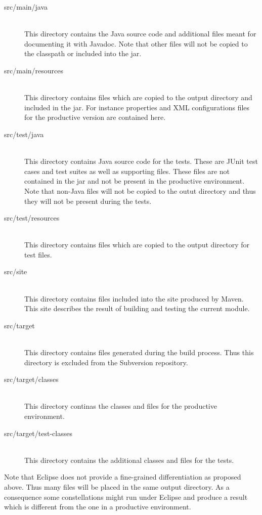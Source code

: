 \begin{description}
\item[src/main/java] \ \\
  This directory contains the Java source code and additional files
  meant for documenting it with Javadoc. Note that other files will
  not be copied to the classpath or included into the jar.
\item[src/main/resources] \ \\
  This directory contains files which are copied to the output
  directory and included in the jar. For instance properties and XML
  configurations files for the productive version are contained here.
\item[src/test/java] \ \\
  This directory contains Java source code for the tests. These are
  JUnit test cases and test suites as well as supporting files. These
  files are not contained in the jar and not be present in the
  productive environment. Note that non-Java files will not be copied
  to the outut directory and thus they will not be present during the
  tests.
\item[src/test/resources] \ \\
  This directory contains files which are copied to the output
  directory for test files.
\item[src/site] \ \\
  This directory contains files included into the site produced by
  Maven. This site describes the result of building and testing the
  current module.
\item[src/target] \ \\
  This directory contains files generated during the build process.
  Thus this directory is excluded from the Subversion repository.
\item[src/target/classes] \ \\
  This directory continas the classes and files for the productive
  environment.
\item[src/target/test-classes] \ \\
  This directory contains the additional classes and files for the
  tests.
\end{description}

Note that Eclipse does not provide a fine-grained differentiation as
proposed above. Thus many files will be placed in the same output
directory. As a consequence some constellations might run under
Eclipse and produce a result which is different from the one in a
productive environment.

